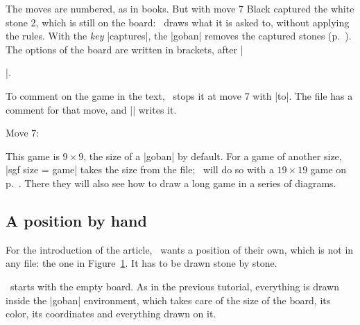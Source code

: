 The moves are numbered, as in books. But with move 7 Black captured the white stone 2, which is still on the board: \pgfgoname\ draws what it is asked to, without applying the rules. With the \emph{key} |captures|, the |goban| removes the captured stones (p.~\pageref{subsec:capturas}). The options of the board are written in brackets, after |\begin{goban}|.

\begin{codeexample}[width=4.8cm]
\begin{goban}[captures]
\end{goban}
\end{codeexample}

To comment on the game in the text, \karu\ stops it at move 7 with |to|. The file has a comment for that move, and |\sgfcomment| writes it.

\begin{codeexample}[width=4.8cm]
\begin{goban}[captures]
\end{goban}

Move 7: 
\end{codeexample}

This game is $9\times9$, the size of a |goban| by default. For a game of another size, |sgf size = game| takes the size from the file; \karu\ will do so with a $19\times19$ game on p.~\pageref{tut:partida}. There they will also see how to draw a long game in a series of diagrams.

\subsection{A position by hand}
\label{tut:posicion}

For the introduction of the article, \karu\ wants a position of their own, which is not in any file: the one in Figure~\ref{fig:primer-ejemplo}. It has to be drawn stone by stone.

\begin{figure}[H]
	\centering
	\begin{goban}[label = {at = {north, west}}]
	\end{goban}
	\caption{}
	\label{fig:primer-ejemplo}
\end{figure}

\karu\ starts with the empty board. As in the previous tutorial, everything is drawn inside the |goban| environment, which takes care of the size of the board, its color, its coordinates and everything drawn on it.


\end{goban}

